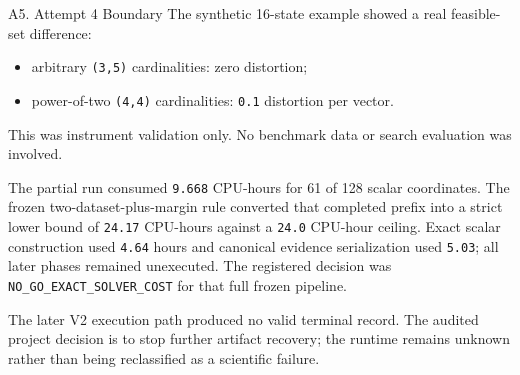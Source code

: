 \documentclass[
  ignorenonframetext,
  aspectratio=169,
]{beamer}
\providecommand{\tightlist}{%
  \setlength{\itemsep}{0pt}\setlength{\parskip}{0pt}}
\begin{document}
\begin{frame}[fragile]{A5. Attempt 4 Boundary}
\protect{}\label{a5-attempt-4-evidence-boundary}
The synthetic 16-state example showed a real feasible-set difference:

\begin{itemize}
\tightlist
\item
  arbitrary \texttt{(3,5)} cardinalities: zero distortion;
\item
  power-of-two \texttt{(4,4)} cardinalities: \texttt{0.1} distortion per
  vector.
\end{itemize}

This was instrument validation only. No benchmark data or search
evaluation was involved.

The partial run consumed \texttt{9.668} CPU-hours for 61 of 128 scalar
coordinates. The frozen two-dataset-plus-margin rule converted that
completed prefix into a strict lower bound of \texttt{24.17}
CPU-hours against a \texttt{24.0} CPU-hour ceiling. Exact scalar
construction used \texttt{4.64} hours and canonical evidence
serialization used \texttt{5.03}; all later phases remained unexecuted.
The registered decision was \texttt{NO\_GO\_EXACT\_SOLVER\_COST} for that
full frozen pipeline.

The later V2 execution path produced no valid terminal record. The
audited project decision is to stop further artifact recovery; the
runtime remains unknown rather than being reclassified as a scientific
failure.

\end{frame}
\end{document}
